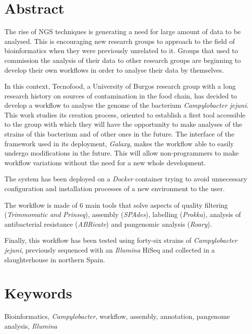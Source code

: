 \newpage

\section*{Abstract}
The rise of NGS techniques is generating a need for large amount of data to be analysed. This is encouraging new research groups to approach to the field of bioinformatics when they were previously unrelated to it. Groups that used to commission the analysis of their data to other research groups are beginning to develop their own workflows in order to analyse their data by themselves.

In this context, Tecnofood, a University of Burgos research group with a long research history on sources of contamination in the food chain, has decided to develop a workflow to analyse the genome of the bacterium \textit{Campylobacter jejuni}. This work studies its creation process, oriented to establish a first tool accessible to the group with which they will have the opportunity to make analyses of the strains of this bacterium and of other ones in the future. The interface of the framework used in its deployment, \textit{Galaxy}, makes the workflow able to easily undergo modifications in the future. This will allow non-programmers to make workflow variations without the need for a new whole development.

The system has been deployed on a \textit{Docker} container trying to avoid unnecessary configuration and installation processes of a new environment to the user.

The workflow is made of 6 main tools that solve aspects of quality filtering (\textit{Trimmomatic and Prinseq}), assembly (\textit{SPAdes}), labelling (\textit{Prokka}), analysis of antibacterial resistance (\textit{ABRicate}) and pangenomic analysis (\textit{Roary}).

Finally, this workflow has been tested using forty-six strains of \textit{Campylobacter jejuni}, previously sequenced with an \textit{Illumina} HiSeq and collected in a slaughterhouse in northern Spain.

\section*{Keywords}
Bioinformatics, \textit{Campylobacter}, workflow, assembly, annotation, pangenome analysis, \textit{Illumina}

